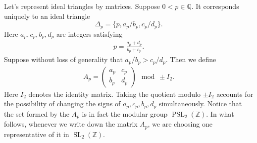 \documentclass[10pt, a4paper]{article}
\newcommand{\Z}{\mathbb{Z}}
\newcommand{\Q}{\mathbb{Q}}
\newcommand{\SL}{\operatorname{SL}_2(\Z)}
\newcommand{\PSL}{\operatorname{PSL}_2(\Z)}
\theoremstyle{definition}
\theoremstyle{remark}
\begin{document}
Let's represent ideal triangles by matrices. Suppose \(0<p\in\Q\). It corresponds uniquely to an ideal triangle \[\Delta_p=\{p,a_p/b_p,c_p/d_p\}.\]
Here \(a_p,c_p,b_p,d_p\) are integers satisfying
\begin{align*}
    p = \frac{a_p+d_p}{b_p+c_p}. 
\end{align*}
Suppose without loss of generality that \(a_p/b_p>c_p/d_p\). Then we define
\begin{align*}
    A_p = \begin{pmatrix} a_p & c_p \\ b_p & d_p \end{pmatrix} \mod \pm I_2.
\end{align*}
Here \(I_2\) denotes the identity matrix. Taking the quotient modulo \(\pm I_2\) accounts for the possibility of changing the signs of \(a_p,c_p,b_p,d_p\) simultaneously. Notice that the set formed by the \(A_p\) is in fact the modular group \(\PSL\).
In what follows, whenever we write down the matrix \(A_p\), we are choosing one representative of it in \(\SL\).
\end{document}
